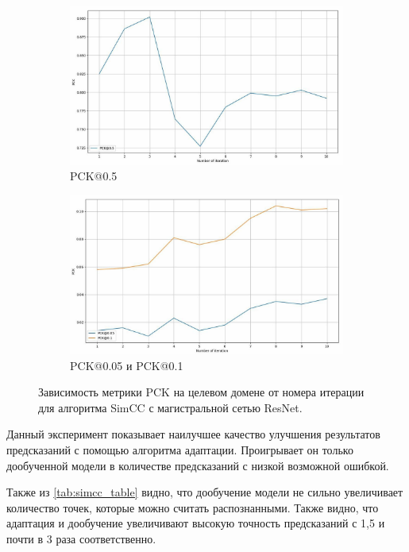 \begin{figure}[H]
\centering
\begin{subfigure}{.95\textwidth}
	\centering
	\includegraphics[width=\textwidth]{./images/experiment/results/simcc/simcc_pck}
	\caption{PCK@0.5}
	\label{fig:simcc_pck_05}
\end{subfigure}
\begin{subfigure}{.95\textwidth}
	\centering
	\includegraphics[width=\textwidth]{./images/experiment/results/simcc/simcc_pck_small}
	\caption{PCK@0.05 и PCK@0.1}
	\label{fig:simcc_pck_small}
\end{subfigure}
\caption{Зависимость метрики PCK на целевом домене от номера итерации для алгоритма SimCC с магистральной сетью ResNet.}
\label{fig:simcc_pck}
\end{figure}

Данный эксперимент показывает наилучшее качество улучшения результатов предсказаний с помощью алгоритма адаптации. Проигрывает он только дообученной модели в количестве предсказаний с низкой возможной ошибкой. 

Также из \autoref{tab:simcc_table} видно, что дообучение модели не сильно увеличивает количество точек, которые можно считать распознанными. Также видно, что адаптация и дообучение увеличивают высокую точность предсказаний с 1,5 и почти в 3 раза соответственно.

